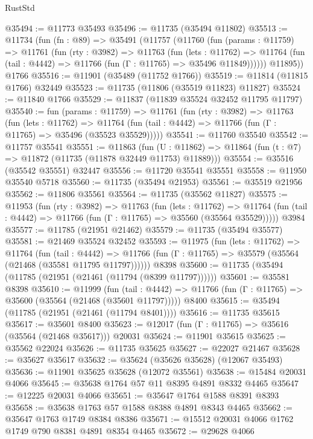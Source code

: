 \begin{lexlean}{RustStd}
\begin{coremodule}
@35494 := @11773 @35493
@35496 := @11735 (@35494 @11802)
@35513 := @11734
    (fun (fn : @89) =>
    @35491
      (@11757
        (@11760
          (fun (params : @11759) =>
          @11761
            (fun (rty : @3982) =>
            @11763
              (fun (lets : @11762) =>
              @11764 (fun (tail : @4442) => @11766 (fun (Γ : @11765) => @35496 @11849))))))
        @11895))
    @1766
@35516 := @11901 (@35489 (@11752 @1766))
@35519 := @11814 (@11815 @1766) @32449
@35523 := @11735 (@11806 (@35519 @11823) @11827)
@35524 := @11840 @1766
@35529 := @11837 (@11839 @35524 @32452 @11795 @11797)
@35540 := fun (params : @11759) =>
  @11761
    (fun (rty : @3982) =>
    @11763
      (fun (lets : @11762) =>
      @11764 (fun (tail : @4442) => @11766 (fun (Γ : @11765) => @35496 (@35523 @35529)))))
@35541 := @11760 @35540
@35542 := @11757 @35541
@35551 := @11863
    (fun (U : @11862) => @11864 (fun (t : @7) => @11872 (@11735 (@11878 @32449 @11753) @11889)))
@35554 := @35516 (@35542 @35551) @32447
@35556 := @11720 @35541 @35551
@35558 := @11950 @35540 @5718
@35560 := @11735 (@35494 @21953)
@35561 := @35519 @21956
@35562 := @11806 @35561
@35564 := @11735 (@35562 @11827)
@35575 := @11953
    (fun (rty : @3982) =>
    @11763
      (fun (lets : @11762) =>
      @11764 (fun (tail : @4442) => @11766 (fun (Γ : @11765) => @35560 (@35564 @35529)))))
    @3984
@35577 := @11785 (@21951 @21462)
@35579 := @11735 (@35494 @35577)
@35581 := @21469 @35524 @32452
@35593 := @11975
    (fun (lets : @11762) =>
    @11764
      (fun (tail : @4442) =>
      @11766 (fun (Γ : @11765) => @35579 (@35564 (@21468 (@35581 @11795 @11797))))))
    @8398
@35600 := @11735 (@35494 (@11785 (@21951 (@21461 (@11794 (@8399 @11797))))))
@35601 := @35581 @8398
@35610 := @11999
    (fun (tail : @4442) => @11766 (fun (Γ : @11765) => @35600 (@35564 (@21468 (@35601 @11797)))))
    @8400
@35615 := @35494 (@11785 (@21951 (@21461 (@11794 @8401))))
@35616 := @11735 @35615
@35617 := @35601 @8400
@35623 := @12017 (fun (Γ : @11765) => @35616 (@35564 (@21468 @35617))) @20031
@35624 := @11901 @35615
@35625 := @35562 @22024
@35626 := @11735 @35625
@35627 := @22027 @21467
@35628 := @35627 @35617
@35632 := @35624 (@35626 @35628) (@12067 @35493)
@35636 := @11901 @35625 @35628 (@12072 @35561)
@35638 := @15484 @20031 @4066
@35645 := @35638 @1764 @57 @11 @8395 @4891 @8332 @4465
@35647 := @12225 @20031 @4066
@35651 := @35647 @1764 @1588 @8391 @8393
@35658 := @35638 @1763 @57 @1588 @8388 @4891 @8343 @4465
@35662 := @35647 @1763 @1749 @8384 @8386
@35671 := @15512 @20031 @4066 @1762 @1749 @790 @8381 @4891 @8354 @4465
@35672 := @29628 @4066

\end{coremodule}
\end{lexlean}
